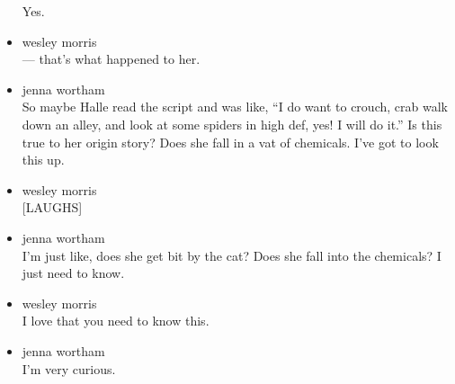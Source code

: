 \begin{itemize}
  Yes.
\item
  wesley morris\\
  --- that's what happened to her.
\item
  jenna wortham\\
  So maybe Halle read the script and was like, ``I do want to crouch,
  crab walk down an alley, and look at some spiders in high def, yes! I
  will do it.'' Is this true to her origin story? Does she fall in a vat
  of chemicals. I've got to look this up.
\item
  wesley morris\\
  {[}LAUGHS{]}
\item
  jenna wortham\\
  I'm just like, does she get bit by the cat? Does she fall into the
  chemicals? I just need to know.
\item
  wesley morris\\
  I love that you need to know this.
\item
  jenna wortham\\
  I'm very curious.


\end{itemize}
